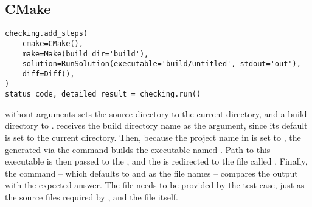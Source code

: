 \subsection{CMake}

\begin{verbatim}
checking.add_steps(
    cmake=CMake(),
    make=Make(build_dir='build'),
    solution=RunSolution(executable='build/untitled', stdout='out'),
    diff=Diff(),
)
status_code, detailed_result = checking.run()
\end{verbatim}

 without arguments sets the source directory to the current directory, and a build directory to
.
 receives the build directory name as the argument, since its default is set to the current directory.
Then, because the project name in  is set to , the  generated via the
 command builds the executable named .
Path to this executable is then passed to the , and the  is redirected to the file
called .
Finally, the  command -- which defaults to  and  as the file names -- compares the
output with the expected answer.
The  file needs to be provided by the test case, just as the source files required by ,
and the  file itself.
